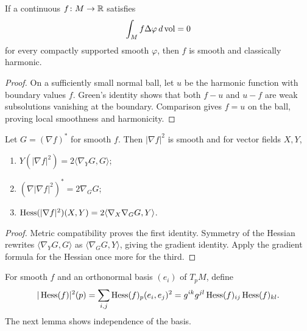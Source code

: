 \begin{theorem}
\label{thm:weak-harmonic-regularity}
\label{eqnlocmax}

If a continuous $f\colon M\to\mathbb{R}$ satisfies
$$\int_M f\Delta\varphi\,d\operatorname{vol}=0$$
for every compactly supported smooth $\varphi$, then $f$ is smooth and
classically harmonic.
\end{theorem}
\begin{proof}
\sketch
{}
On a sufficiently small normal ball, let $u$ be the harmonic function
with boundary values $f$. Green's identity shows that both $f-u$ and
$u-f$ are weak subsolutions vanishing at the boundary. Comparison gives
$f=u$ on the ball, proving local smoothness and harmonicity.
\end{proof}

\begin{lemma}
\label{lem:gradient-norm-sq-gradient}





Let $G=(\nabla f)^*$ for smooth $f$. Then $|\nabla f|^2$ is smooth and
for vector fields $X,Y$,
\begin{enumerate}
\item $Y(|\nabla f|^2)=2\langle\nabla_YG,G\rangle$;
\item $(\nabla|\nabla f|^2)^*=2\nabla_GG$;
\item $\operatorname{Hess}(|\nabla f|^2)(X,Y)=2\langle\nabla_X\nabla_GG,Y\rangle$.
\end{enumerate}
\end{lemma}
\begin{proof}
\sketch
{}

Metric compatibility proves the first identity. Symmetry of the Hessian
rewrites $\langle\nabla_YG,G\rangle$ as
$\langle\nabla_GG,Y\rangle$, giving the gradient identity. Apply the
gradient formula for the Hessian once more for the third.
\end{proof}

\begin{definition}
\label{def:hessian-norm-sq}





For smooth $f$ and an orthonormal basis $(e_i)$ of $T_pM$, define
$$|\operatorname{Hess}(f)|^2(p)=\sum_{i,j}\operatorname{Hess}(f)_p(e_i,e_j)^2
=g^{ik}g^{jl}\operatorname{Hess}(f)_{ij}\operatorname{Hess}(f)_{kl}.$$
The next lemma shows independence of the basis.
\end{definition}

